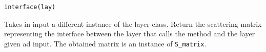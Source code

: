 \documentclass[a4paper,10pt]{report}
\begin{document}
\begin{lstlisting}[language=Python,basicstyle=\ttfamily\Large]
interface(lay)
\end{lstlisting}
Takes in input a different instance of the layer class. Return the scattering matrix representing the interface between the layer that calls the method and the layer given ad input.  The obtained matrix is an instance of \texttt{S\_matrix}. 
\end{document}
